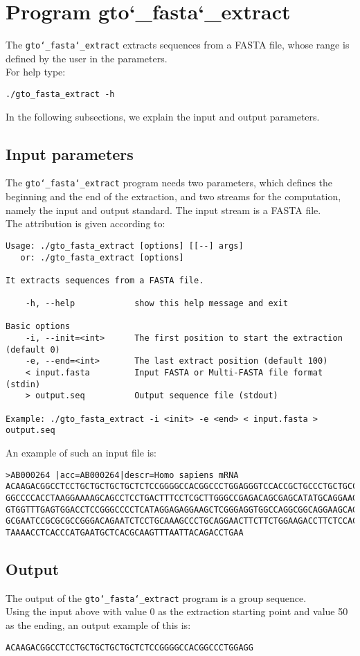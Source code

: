\section{Program gto\char`_fasta\char`_extract}
The \texttt{gto\char`_fasta\char`_extract} extracts sequences from a FASTA file, whose range is defined by the user in the parameters.\\
For help type:
\begin{lstlisting}
./gto_fasta_extract -h
\end{lstlisting}
In the following subsections, we explain the input and output parameters.

\subsection*{Input parameters}

The \texttt{gto\char`_fasta\char`_extract} program needs two parameters, which defines the beginning and the end of the extraction, and two streams for the computation, namely the input and output standard. The input stream is a FASTA file.\\
The attribution is given according to:
\begin{lstlisting}
Usage: ./gto_fasta_extract [options] [[--] args]
   or: ./gto_fasta_extract [options]

It extracts sequences from a FASTA file.

    -h, --help            show this help message and exit

Basic options
    -i, --init=<int>      The first position to start the extraction (default 0)
    -e, --end=<int>       The last extract position (default 100)
    < input.fasta         Input FASTA or Multi-FASTA file format (stdin)
    > output.seq          Output sequence file (stdout)

Example: ./gto_fasta_extract -i <init> -e <end> < input.fasta > output.seq
\end{lstlisting}
An example of such an input file is:
\begin{lstlisting}
>AB000264 |acc=AB000264|descr=Homo sapiens mRNA 
ACAAGACGGCCTCCTGCTGCTGCTGCTCTCCGGGGCCACGGCCCTGGAGGGTCCACCGCTGCCCTGCTGCCATTGTCCCC
GGCCCCACCTAAGGAAAAGCAGCCTCCTGACTTTCCTCGCTTGGGCCGAGACAGCGAGCATATGCAGGAAGCGGCAGGAA
GTGGTTTGAGTGGACCTCCGGGCCCCTCATAGGAGAGGAAGCTCGGGAGGTGGCCAGGCGGCAGGAAGCAGGCCAGTGCC
GCGAATCCGCGCGCCGGGACAGAATCTCCTGCAAAGCCCTGCAGGAACTTCTTCTGGAAGACCTTCTCCACCCCCCCAGC
TAAAACCTCACCCATGAATGCTCACGCAAGTTTAATTACAGACCTGAA
\end{lstlisting}

\subsection*{Output}
The output of the \texttt{gto\char`_fasta\char`_extract} program is a group sequence.\\
Using the input above with value 0 as the extraction starting point and value 50 as the ending, an output example of this is:
\begin{lstlisting}
ACAAGACGGCCTCCTGCTGCTGCTGCTCTCCGGGGCCACGGCCCTGGAGG
\end{lstlisting}